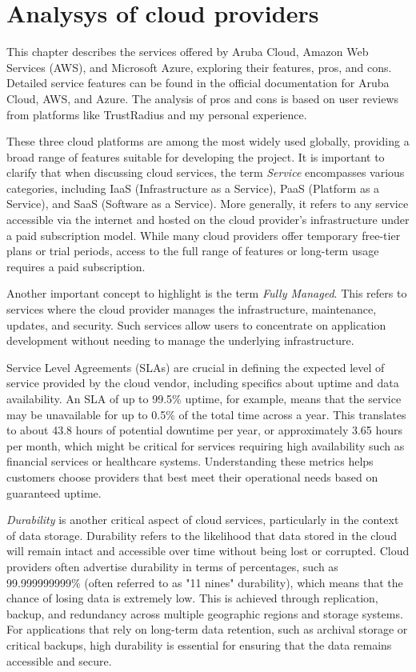 \chapter{Analysys of cloud providers}
\label{cap:cloud}
This chapter describes the services offered by Aruba Cloud, Amazon Web Services (AWS), and Microsoft Azure, exploring their features, pros, and cons. Detailed service features can be found in the official documentation for Aruba Cloud\cite{site:aruba-docs}, AWS\cite{site:aws-docs}, and Azure\cite{site:azure-docs}. The analysis of pros and cons is based on user reviews from platforms like TrustRadius\cite{site:trust-radius} and my personal experience.

These three cloud platforms are among the most widely used globally, providing a broad range of features suitable for developing the project. It is important to clarify that when discussing cloud services, the term \textit{Service} encompasses various categories, including IaaS (Infrastructure as a Service), PaaS (Platform as a Service), and SaaS (Software as a Service). More generally, it refers to any service accessible via the internet and hosted on the cloud provider's infrastructure under a paid subscription model. While many cloud providers offer temporary free-tier plans or trial periods, access to the full range of features or long-term usage requires a paid subscription.

Another important concept to highlight is the term \textit{Fully Managed}. This refers to services where the cloud provider manages the infrastructure, maintenance, updates, and security. Such services allow users to concentrate on application development without needing to manage the underlying infrastructure.

Service Level Agreements (SLAs) are crucial in defining the expected level of service provided by the cloud vendor, including specifics about uptime and data availability. An SLA of up to 99.5\% uptime, for example, means that the service may be unavailable for up to 0.5\% of the total time across a year. This translates to about 43.8 hours of potential downtime per year, or approximately 3.65 hours per month, which might be critical for services requiring high availability such as financial services or healthcare systems. Understanding these metrics helps customers choose providers that best meet their operational needs based on guaranteed uptime.

\textit{Durability} is another critical aspect of cloud services, particularly in the context of data storage. Durability refers to the likelihood that data stored in the cloud will remain intact and accessible over time without being lost or corrupted. Cloud providers often advertise durability in terms of percentages, such as 99.999999999\% (often referred to as "11 nines" durability), which means that the chance of losing data is extremely low. This is achieved through replication, backup, and redundancy across multiple geographic regions and storage systems. For applications that rely on long-term data retention, such as archival storage or critical backups, high durability is essential for ensuring that the data remains accessible and secure.


